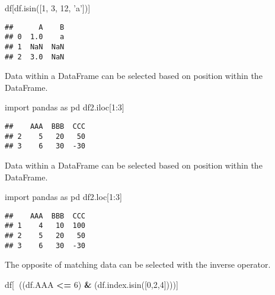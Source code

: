\documentclass[]{book}
\newenvironment{Shaded}{\begin{snugshade}}{\end{snugshade}}
\newcommand{\DecValTok}[1]{\textcolor[rgb]{0.00,0.00,0.81}{#1}}
\newcommand{\StringTok}[1]{\textcolor[rgb]{0.31,0.60,0.02}{#1}}
\newcommand{\ImportTok}[1]{#1}
\newcommand{\OperatorTok}[1]{\textcolor[rgb]{0.81,0.36,0.00}{\textbf{#1}}}
\newcommand{\NormalTok}[1]{#1}
\begin{document}
\begin{Shaded}
\begin{Highlighting}[]
\NormalTok{df[df.isin([}\DecValTok{1}\NormalTok{, }\DecValTok{3}\NormalTok{, }\DecValTok{12}\NormalTok{, }\StringTok{'a'}\NormalTok{])]}
\end{Highlighting}
\end{Shaded}

\begin{verbatim}
##      A    B
## 0  1.0    a
## 1  NaN  NaN
## 2  3.0  NaN
\end{verbatim}

Data within a DataFrame can be selected based on position within the
DataFrame.

\begin{Shaded}
\begin{Highlighting}[]
\ImportTok{import}\NormalTok{ pandas }\ImportTok{as}\NormalTok{ pd}
\NormalTok{df2.iloc[}\DecValTok{1}\NormalTok{:}\DecValTok{3}\NormalTok{]}
\end{Highlighting}
\end{Shaded}

\begin{verbatim}
##    AAA  BBB  CCC
## 2    5   20   50
## 3    6   30  -30
\end{verbatim}

Data within a DataFrame can be selected based on position within the
DataFrame.

\begin{Shaded}
\begin{Highlighting}[]
\ImportTok{import}\NormalTok{ pandas }\ImportTok{as}\NormalTok{ pd}
\NormalTok{df2.loc[}\DecValTok{1}\NormalTok{:}\DecValTok{3}\NormalTok{]}
\end{Highlighting}
\end{Shaded}

\begin{verbatim}
##    AAA  BBB  CCC
## 1    4   10  100
## 2    5   20   50
## 3    6   30  -30
\end{verbatim}

The opposite of matching data can be selected with the inverse operator.

\begin{Shaded}
\begin{Highlighting}[]
\NormalTok{df[}\OperatorTok{~}\NormalTok{((df.AAA }\OperatorTok{<=} \DecValTok{6}\NormalTok{) }\OperatorTok{&}\NormalTok{ (df.index.isin([}\DecValTok{0}\NormalTok{,}\DecValTok{2}\NormalTok{,}\DecValTok{4}\NormalTok{])))]}
\end{Highlighting}
\end{Shaded}
\end{document}
